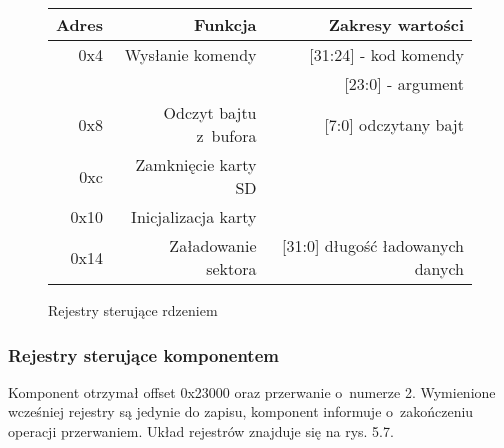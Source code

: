 \begin{figure}[h]
	\centering
	\begin{tabular}{|r|r|r|}
		\hline
		Adres & Funkcja & Zakresy wartości\\
		\hline
		0x4 & Wysłanie komendy & [31:24] - kod komendy\\
			&				   & [23:0] - argument \\			
		0x8 & Odczyt bajtu z~bufora & [7:0] odczytany bajt\\			
		0xc & Zamknięcie karty SD & \\		
		0x10 & Inicjalizacja karty & \\
		0x14 & Załadowanie sektora & [31:0] długość ładowanych danych\\		
		\hline
	\end{tabular}
	
	\caption{Rejestry sterujące rdzeniem}
\end{figure}
\FloatBarrier %



\subsubsection{Rejestry sterujące komponentem}


Komponent otrzymał offset 0x23000 oraz przerwanie o~numerze 2. Wymienione wcześniej rejestry są jedynie do zapisu, komponent informuje o~zakończeniu operacji przerwaniem. Układ rejestrów znajduje się na rys. 5.7.


